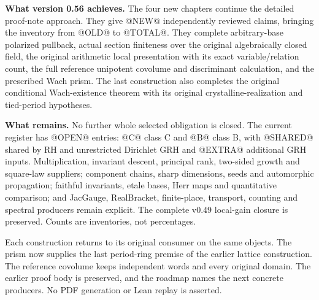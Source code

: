 \textbf{What version 0.56 achieves.}
The four new chapters continue the detailed proof-note approach.
They give @NEW@ independently reviewed claims, bringing the inventory
from @OLD@ to @TOTAL@. They complete arbitrary-base polarized pullback,
actual section finiteness over the original algebraically closed field,
the original arithmetic local presentation
with its exact variable/relation count, the full reference unipotent
covolume and discriminant calculation, and the prescribed Wach prism.
The last construction also completes the original conditional
Wach-existence theorem with its original crystalline-realization and
tied-period hypotheses.

\medskip
\textbf{What remains.}
No further whole selected obligation is closed. The current register has
@OPEN@ entries: @C@ class C and @B@ class B, with @SHARED@ shared by
RH and unrestricted Dirichlet GRH and @EXTRA@ additional GRH inputs.
Multiplication, invariant descent, principal rank, two-sided growth and
square-law suppliers; component chains, sharp dimensions, seeds and
automorphic propagation; faithful invariants, etale bases, Herr maps
and quantitative comparison; and JacGauge, RealBracket, finite-place,
transport, counting and spectral producers remain explicit.
The complete v0.49 local-gain closure is preserved.
Counts are inventories, not percentages.

\medskip
Each construction returns to its original consumer on the same objects.
The prism now supplies the last period-ring premise of the earlier
lattice construction. The reference covolume keeps independent words
and every original domain. The earlier proof body is preserved, and
the roadmap names the next concrete producers.
No PDF generation or Lean replay is asserted.
